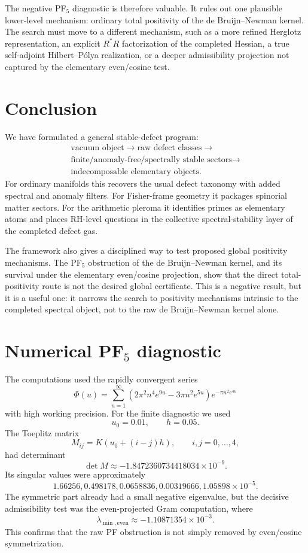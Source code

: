 \documentclass[11pt]{article}
\begin{document}
The negative PF$_5$ diagnostic is therefore valuable. It rules out one plausible lower-level mechanism: ordinary total positivity of the de Bruijn--Newman kernel. The search must move to a different mechanism, such as a more refined Herglotz representation, an explicit $R^*R$ factorization of the completed Hessian, a true self-adjoint Hilbert--P\'olya realization, or a deeper admissibility projection not captured by the elementary even/cosine test.

\section{Conclusion}

We have formulated a general stable-defect program:
\[
\boxed{
\begin{gathered}
        \text{vacuum object}\longrightarrow\text{raw defect classes}\longrightarrow\\
        \text{finite/anomaly-free/spectrally stable sectors}\longrightarrow\\
        \text{indecomposable elementary objects}.
\end{gathered}
}
\]
For ordinary manifolds this recovers the usual defect taxonomy with added spectral and anomaly filters. For Fisher-frame geometry it packages spinorial matter sectors. For the arithmetic pleroma it identifies primes as elementary atoms and places RH-level questions in the collective spectral-stability layer of the completed defect gas.

The framework also gives a disciplined way to test proposed global positivity mechanisms. The PF$_5$ obstruction of the de Bruijn--Newman kernel, and its survival under the elementary even/cosine projection, show that the direct total-positivity route is not the desired global certificate. This is a negative result, but it is a useful one: it narrows the search to positivity mechanisms intrinsic to the completed spectral object, not to the raw de Bruijn--Newman kernel alone.

\appendix

\section{Numerical PF\texorpdfstring{$_5$}{5} diagnostic}

The computations used the rapidly convergent series
\[
\Phi(u)=\sum_{n=1}^{\infty}\left(2\pi^2n^4e^{9u}-3\pi n^2e^{5u}\right)e^{-\pi n^2e^{4u}}
\]
with high working precision. For the finite diagnostic we used
\[
        u_0=0.01,
        \qquad h=0.05.
\]
The Toeplitz matrix
\[
        M_{ij}=K(u_0+(i-j)h),\qquad i,j=0,\ldots,4,
\]
had determinant
\[
        \det M\approx -1.8472360734418034\times10^{-9}.
\]
Its singular values were approximately
\[
        1.66256,
        0.498178,
        0.0658836,
        0.00319666,
        1.05898\times10^{-5}.
\]
The symmetric part already had a small negative eigenvalue, but the decisive admissibility test was the even-projected Gram computation, where
\[
        \lambda_{\min,\mathrm{even}}\approx -1.10871354\times10^{-3}.
\]
This confirms that the raw PF obstruction is not simply removed by even/cosine symmetrization.
\end{document}

